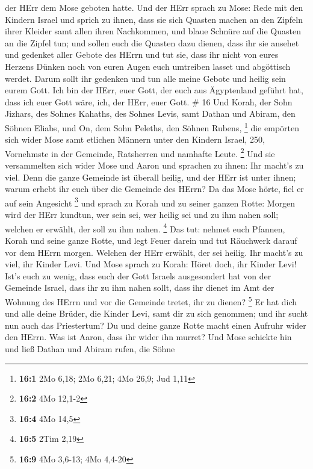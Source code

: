 der HErr dem Mose geboten hatte.  Und der HErr sprach zu
Mose:  Rede mit den Kindern Israel und sprich zu ihnen,
dass sie sich Quasten machen an den Zipfeln ihrer Kleider samt allen
ihren Nachkommen, und blaue Schnüre auf die Quasten an die Zipfel tun;
 und sollen euch die Quasten dazu dienen, dass ihr sie
ansehet und gedenket aller Gebote des HErrn und tut sie, dass ihr nicht
von eures Herzens Dünken noch von euren Augen euch umtreiben lasset und
abgöttisch werdet.  Darum sollt ihr gedenken und tun alle
meine Gebote und heilig sein eurem Gott.  Ich bin der HErr,
euer Gott, der euch aus Ägyptenland geführt hat, dass ich euer Gott
wäre, ich, der HErr, euer Gott. \# 16  Und Korah, der Sohn
Jizhars, des Sohnes Kahaths, des Sohnes Levis, samt Dathan und Abiram,
den Söhnen Eliabs, und On, dem Sohn Peleths, den Söhnen Rubens,
\footnote{\textbf{16:1} 2Mo 6,18; 2Mo 6,21; 4Mo 26,9; Jud 1,11}
 die empörten sich wider Mose samt etlichen Männern unter
den Kindern Israel, 250, Vornehmste in der Gemeinde, Ratsherren und
namhafte Leute. \footnote{\textbf{16:2} 4Mo 12,1-2}  Und sie
versammelten sich wider Mose und Aaron und sprachen zu ihnen: Ihr
macht's zu viel. Denn die ganze Gemeinde ist überall heilig, und der
HErr ist unter ihnen; warum erhebt ihr euch über die Gemeinde des HErrn?
 Da das Mose hörte, fiel er auf sein Angesicht \footnote{\textbf{16:4}
  4Mo 14,5}  und sprach zu Korah und zu seiner ganzen Rotte:
Morgen wird der HErr kundtun, wer sein sei, wer heilig sei und zu ihm
nahen soll; welchen er erwählt, der soll zu ihm nahen. \footnote{\textbf{16:5}
  2Tim 2,19}  Das tut: nehmet euch Pfannen, Korah und seine
ganze Rotte,  und legt Feuer darein und tut Räuchwerk darauf
vor dem HErrn morgen. Welchen der HErr erwählt, der sei heilig. Ihr
macht's zu viel, ihr Kinder Levi.  Und Mose sprach zu Korah:
Höret doch, ihr Kinder Levi!  Ist's euch zu wenig, dass euch
der Gott Israels ausgesondert hat von der Gemeinde Israel, dass ihr zu
ihm nahen sollt, dass ihr dienet im Amt der Wohnung des HErrn und vor
die Gemeinde tretet, ihr zu dienen? \footnote{\textbf{16:9} 4Mo 3,6-13;
  4Mo 4,4-20}  Er hat dich und alle deine Brüder, die
Kinder Levi, samt dir zu sich genommen; und ihr sucht nun auch das
Priestertum?  Du und deine ganze Rotte macht einen Aufruhr
wider den HErrn. Was ist Aaron, dass ihr wider ihn murret? 
Und Mose schickte hin und ließ Dathan und Abiram rufen, die Söhne
